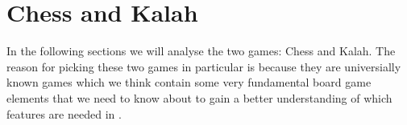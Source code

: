 \section{Chess and Kalah}
\label{sec:chessandkalah}

In the following sections we will analyse the two games: Chess and Kalah. The reason for picking these two games in particular is because they are universially known games which we think contain some very fundamental board game elements that we need to know about to gain a better understanding of which features are needed in \productname{}.


  

